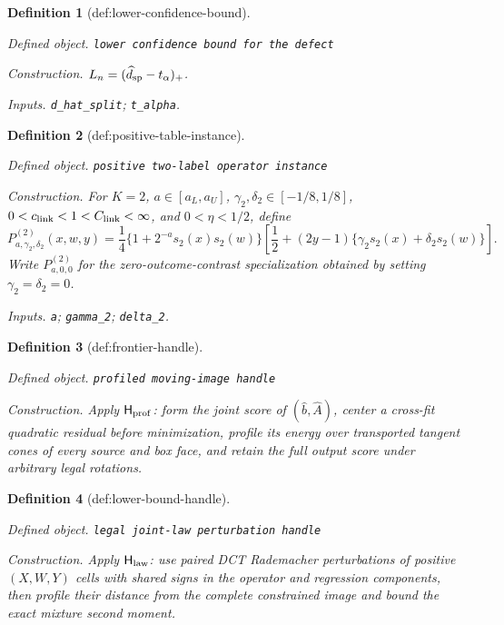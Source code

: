 \documentclass{article}
\newtheorem{definition}{Definition}
\begin{document}
\begin{definition}[def:lower-confidence-bound]\label{def:lower-confidence-bound}
\par\smallskip\noindent\emph{Defined object.} \texttt{lower confidence bound for the defect}
\par\smallskip\noindent\emph{Construction.} \(L_n=(\widehat d_{\rm sp}-t_\alpha)_+\).
\par\smallskip\noindent\emph{Inputs.} \texttt{d\_\allowbreak{}hat\_\allowbreak{}split}; \texttt{t\_\allowbreak{}alpha}.
\end{definition}

\begin{definition}[def:positive-table-instance]\label{def:positive-table-instance}
\par\smallskip\noindent\emph{Defined object.} \texttt{positive two-\allowbreak{}label operator instance}
\par\smallskip\noindent\emph{Construction.} For \(K=2\), \(a\in[a_L,a_U]\), \(\gamma_2,\delta_2\in[-1/8,1/8]\), \(0<c_{\rm link}<1<C_{\rm link}<\infty\), and \(0<\eta<1/2\), define
\[
P^{(2)}_{a,\gamma_2,\delta_2}(x,w,y)
=\frac14\{1+2^{-a}s_2(x)s_2(w)\}
\left[\frac12+(2y-1)\{\gamma_2s_2(x)+\delta_2s_2(w)\}\right].
\]
Write \(P^{(2)}_{a,0,0}\) for the zero-outcome-contrast specialization obtained by setting \(\gamma_2=\delta_2=0\).
\par\smallskip\noindent\emph{Inputs.} \texttt{a}; \texttt{gamma\_\allowbreak{}2}; \texttt{delta\_\allowbreak{}2}.
\end{definition}

\begin{definition}[def:frontier-handle]\label{def:frontier-handle}
\par\smallskip\noindent\emph{Defined object.} \texttt{profiled moving-\allowbreak{}image handle}
\par\smallskip\noindent\emph{Construction.} Apply \(\mathsf H_{\rm prof}\): form the joint score of \((\widehat b,\widehat A)\), center a cross-fit quadratic residual before minimization, profile its energy over transported tangent cones of every source and box face, and retain the full output score under arbitrary legal rotations.
\end{definition}

\begin{definition}[def:lower-bound-handle]\label{def:lower-bound-handle}
\par\smallskip\noindent\emph{Defined object.} \texttt{legal joint-\allowbreak{}law perturbation handle}
\par\smallskip\noindent\emph{Construction.} Apply \(\mathsf H_{\rm law}\): use paired DCT Rademacher perturbations of positive \((X,W,Y)\) cells with shared signs in the operator and regression components, then profile their distance from the complete constrained image and bound the exact mixture second moment.
\end{definition}
\end{document}
